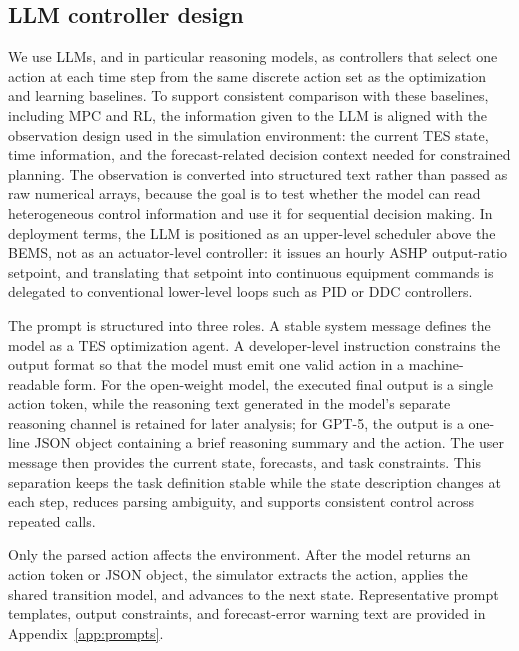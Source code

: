 \documentclass[11pt]{article}
\begin{document}
\subsection{LLM controller design}\label{subsec:controller-design}
We use LLMs, and in particular reasoning models, as controllers that select one action at each time step from the same discrete action set as the optimization and learning baselines. To support consistent comparison with these baselines, including MPC and RL, the information given to the LLM is aligned with the observation design used in the simulation environment: the current TES state, time information, and the forecast-related decision context needed for constrained planning. The observation is converted into structured text rather than passed as raw numerical arrays, because the goal is to test whether the model can read heterogeneous control information and use it for sequential decision making. In deployment terms, the LLM is positioned as an upper-level scheduler above the BEMS, not as an actuator-level controller: it issues an hourly ASHP output-ratio setpoint, and translating that setpoint into continuous equipment commands is delegated to conventional lower-level loops such as PID or DDC controllers.

The prompt is structured into three roles. A stable system message defines the model as a TES optimization agent. A developer-level instruction constrains the output format so that the model must emit one valid action in a machine-readable form. For the open-weight model, the executed final output is a single action token, while the reasoning text generated in the model's separate reasoning channel is retained for later analysis; for GPT-5, the output is a one-line JSON object containing a brief reasoning summary and the action. The user message then provides the current state, forecasts, and task constraints. This separation keeps the task definition stable while the state description changes at each step, reduces parsing ambiguity, and supports consistent control across repeated calls.

Only the parsed action affects the environment. After the model returns an action token or JSON object, the simulator extracts the action, applies the shared transition model, and advances to the next state. Representative prompt templates, output constraints, and forecast-error warning text are provided in Appendix~\ref{app:prompts}.
\end{document}
